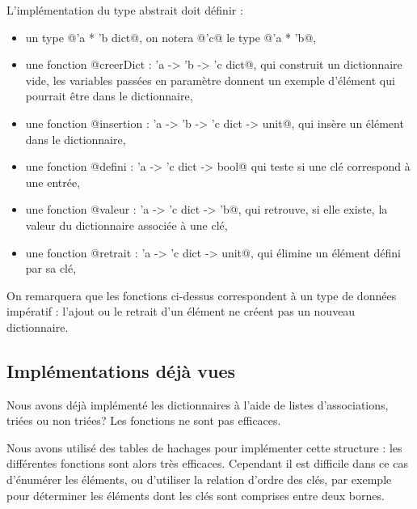 L'implémentation du type abstrait doit définir :
\begin{itemize}
\item un type @'a * 'b dict@, on notera @'c@ le type @'a * 'b@,
\item une fonction @creerDict : 'a ->  'b -> 'c dict@, qui construit un dictionnaire vide, les variables passées en paramètre donnent un exemple d'élément qui pourrait être dans le dictionnaire,

\item une fonction @insertion : 'a -> 'b -> 'c dict -> unit@, qui insère un élément dans le dictionnaire,
\item une fonction @defini : 'a -> 'c dict -> bool@ qui teste si une clé correspond à une entrée,
\item une fonction @valeur : 'a -> 'c dict -> 'b@, qui retrouve, si elle existe, la valeur du dictionnaire associée à une clé,
\item une fonction @retrait : 'a -> 'c dict -> unit@, qui élimine un élément défini par sa clé, 
\end{itemize}
On remarquera que les fonctions ci-dessus correspondent à un type de données impératif : l'ajout ou le retrait d'un élément ne créent pas un nouveau dictionnaire.
\subsection{Implémentations déjà vues}
Nous avons déjà implémenté les dictionnaires à l'aide de listes d'associations, triées ou non triées? Les fonctions ne sont pas efficaces.

Nous avons utilisé des tables de hachages pour implémenter cette structure : les différentes fonctions sont alors très efficaces. Cependant il est difficile dans ce cas d'énumérer les éléments, ou d'utiliser la relation d'ordre des clés, par exemple pour déterminer les éléments dont les clés sont comprises entre deux bornes.
